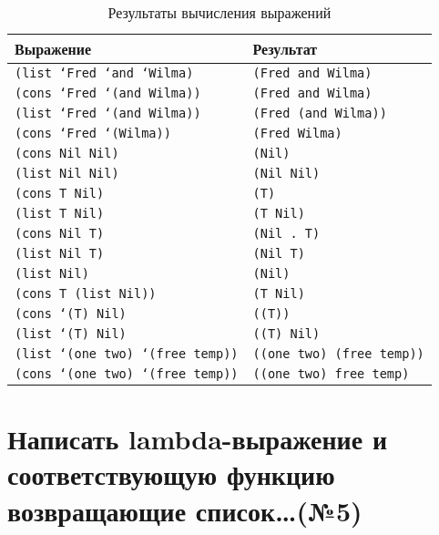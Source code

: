 \begin{table}[ht]
	\begin{center}
		\caption{Результаты вычисления выражений}
		\begin{tabular}{|l|l|}
			\hline
			\bfseries Выражение & \bfseries Результат \\\hline
            \texttt{(list `Fred `and `Wilma)} & \texttt{(Fred and Wilma)} \\\hline
            \texttt{(cons `Fred `(and Wilma))} & \texttt{(Fred and Wilma)} \\\hline
            \texttt{(list `Fred `(and Wilma))} & \texttt{(Fred (and Wilma))} \\\hline
            \texttt{(cons `Fred `(Wilma))} & \texttt{(Fred Wilma)} \\\hline
            \texttt{(cons Nil Nil)} & \texttt{(Nil)}\\\hline
            \texttt{(list Nil Nil)} & \texttt{(Nil Nil)}\\\hline
            \texttt{(cons T Nil)} & \texttt{(T)} \\\hline
            \texttt{(list T Nil)} & \texttt{(T Nil)} \\\hline
            \texttt{(cons Nil T)} & \texttt{(Nil . T)}\\\hline
            \texttt{(list Nil T)} & \texttt{(Nil T)}\\\hline
            \texttt{(list Nil)} & \texttt{(Nil)}\\\hline
            \texttt{(cons T (list Nil))} & \texttt{(T Nil)} \\\hline
            \texttt{(cons `(T) Nil)} & \texttt{((T))} \\\hline
            \texttt{(list `(T) Nil)} & \texttt{((T) Nil)} \\\hline
            \texttt{(list `(one two) `(free temp))} & \texttt{((one two) (free temp))} \\\hline
            \texttt{(cons `(one two) `(free temp))} & \texttt{((one two) free temp)} \\\hline
		\end{tabular}
	\end{center}
\end{table}

\clearpage
    
\section{Написать lambda-выражение и соответствующую функцию возвращающие список\dots (№5)}

